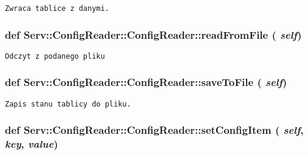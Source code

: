 \footnotesize\begin{verbatim}Zwraca tablice z danymi.\end{verbatim}
\normalsize
 \hypertarget{class_serv_1_1_config_reader_1_1_config_reader_c8ff5305639fac5691feb7de4ae9ceea}{
\subsubsection[{readFromFile}]{\setlength{\rightskip}{0pt plus 5cm}def Serv::ConfigReader::ConfigReader::readFromFile ( {\em self})}}
\label{class_serv_1_1_config_reader_1_1_config_reader_c8ff5305639fac5691feb7de4ae9ceea}




\footnotesize\begin{verbatim}Odczyt z podanego pliku\end{verbatim}
\normalsize
 \hypertarget{class_serv_1_1_config_reader_1_1_config_reader_919cf4af7c9d0eb3a91ef578731edb0a}{
\subsubsection[{saveToFile}]{\setlength{\rightskip}{0pt plus 5cm}def Serv::ConfigReader::ConfigReader::saveToFile ( {\em self})}}
\label{class_serv_1_1_config_reader_1_1_config_reader_919cf4af7c9d0eb3a91ef578731edb0a}




\footnotesize\begin{verbatim}Zapis stanu tablicy do pliku.\end{verbatim}
\normalsize
 \hypertarget{class_serv_1_1_config_reader_1_1_config_reader_44baeb28dc94ccbc797ab1164d98fa04}{
\subsubsection[{setConfigItem}]{\setlength{\rightskip}{0pt plus 5cm}def Serv::ConfigReader::ConfigReader::setConfigItem ( {\em self}, \/   {\em key}, \/   {\em value})}}
\label{class_serv_1_1_config_reader_1_1_config_reader_44baeb28dc94ccbc797ab1164d98fa04}




